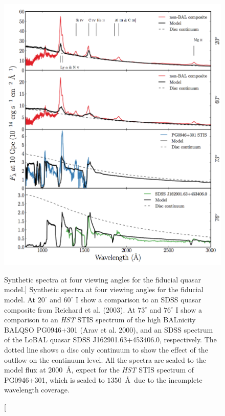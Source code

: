 \begin{figure}
\centering
\includegraphics[width=1.0\textwidth]{figures/06-agnpaper/fig3.png}
\caption
[Synthetic spectra at four viewing angles for the fiducial quasar model.]
{
Synthetic spectra at four viewing angles for the fiducial model. At 
$20^\circ$ and $60^\circ$ I show a comparison to an SDSS quasar composite
from Reichard et al. (2003). At $73^\circ$ and $76^\circ$ I show a comparison to
an {\sl HST} STIS spectrum of the high BALnicity BALQSO 
PG0946+301 (Arav et al. 2000), and an SDSS spectrum of the LoBAL quasar 
SDSS J162901.63+453406.0, respectively. The dotted line shows a disc
only continuum to show the effect of the outflow on the continuum level. 
All the spectra are scaled to the model flux at $2000$~\AA, expect for the 
{\sl HST} STIS spectrum of PG0946+301, which is scaled to $1350$~\AA\
due to the incomplete wavelength coverage.
}
\label{fig:uvspec}
\end{figure}


